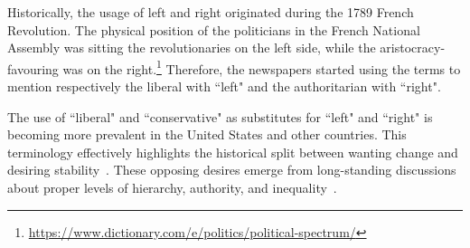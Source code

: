 
Historically, the usage of left and right originated during the 1789 French Revolution. The physical position of the politicians in the French National Assembly was sitting the revolutionaries on the left side, while the aristocracy-favouring was on the right.\footnote{\url{https://www.dictionary.com/e/politics/political-spectrum/}}
Therefore, the newspapers started using the terms to mention respectively the liberal with ``left" and the authoritarian with ``right".



The use of ``liberal" and ``conservative" as substitutes for ``left" and ``right" is becoming more prevalent in the United States and other countries.
This terminology effectively highlights the historical split between wanting change and desiring stability~\cite{jost2009political}.
These opposing desires emerge from long-standing discussions about proper levels of hierarchy, authority, and inequality~\citep{bobbio1996left}.





